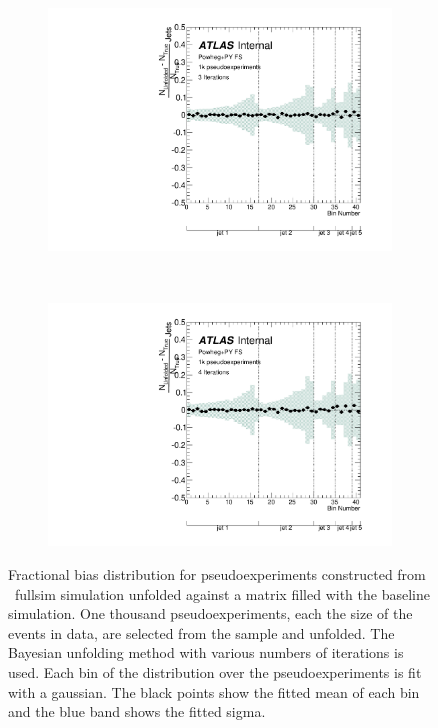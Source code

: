 \begin{figure}
\begin{subfigure}[]{0.5\textwidth}
\includegraphics[width=\textwidth]{fig/Stress/117050fullsim/FracBias3Iterations.pdf}
\end{subfigure}
~
\begin{subfigure}[]{0.5\textwidth}
\includegraphics[width=\textwidth]{fig/Stress/117050fullsim/FracBias4Iterations.pdf}
\end{subfigure}
\caption{Fractional bias distribution for pseudoexperiments constructed from \newline \powpy\ fullsim simulation unfolded against a matrix filled with the baseline simulation. One thousand pseudoexperiments, each the size of the events in data, are selected from the sample and unfolded. The Bayesian unfolding method with various numbers of iterations is used. Each bin of the distribution over the pseudoexperiments is fit with a gaussian. The black points show the fitted mean of each bin and the blue band shows the fitted sigma.}
\label{fig:fsfrbias}
\end{figure}
